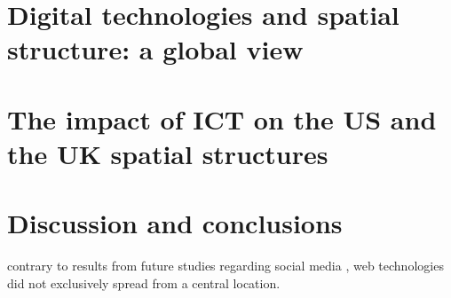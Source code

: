 \documentclass[
  authoryear,
  preprint,
  3p]{elsarticle}
\begin{document}
\hypertarget{sec4}{%
\section{Digital technologies and spatial structure: a global
view}\label{sec4}}

\hypertarget{sec5}{%
\section{The impact of ICT on the US and the UK spatial
structures}\label{sec5}}

\hypertarget{sec6}{%
\section{Discussion and conclusions}\label{sec6}}

contrary to results from future studies regarding social media
\citep{lengyel2020role}, web technologies did not exclusively spread
from a central location.


\renewcommand\refname{References}
  
\end{document}
